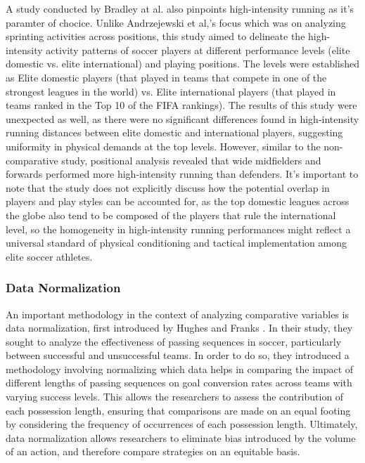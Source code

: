 A study conducted by Bradley at al. \cite{Bradley2010} also pinpoints high-intensity running as it's paramter of chocice. Unlike Andrzejewski et al,'s \cite{Andrzejewski2013} focus which was on analyzing sprinting activities across positions, this study aimed to delineate the high-intensity activity patterns of soccer players at different performance levels (elite domestic vs. elite international) and playing positions. The levels were established as Elite domestic players (that played in teams that compete in one of the strongest leagues in the world) vs. Elite international players (that played in teams ranked in the Top 10 of the FIFA rankings). The results of this study were unexpected as well, as there were no significant differences found in high-intensity running distances between elite domestic and international players, suggesting uniformity in physical demands at the top levels. However, similar to the non-comparative study, positional analysis revealed that wide midfielders and forwards performed more high-intensity running than defenders. It's important to note that the study does not explicitly discuss how the potential overlap in players and play styles can be accounted for, as the top domestic leagues across the globe also tend to be composed of the players that rule the international level, so the homogeneity in high-intensity running performances might reflect a universal standard of physical conditioning and tactical implementation among elite soccer athletes. 


\subsubsection{Data Normalization}
An important methodology in the context of analyzing comparative variables is data normalization, first introduced by Hughes and Franks \cite{Hughes2005}. In their study, they sought to analyze the effectiveness of passing sequences in soccer, particularly between successful and unsuccessful teams. In order to do so, they introduced a methodology involving normalizing which data helps in comparing the impact of different lengths of passing sequences on goal conversion rates across teams with varying success levels. This allows the researchers to assess the contribution of each possession length, ensuring that comparisons are made on an equal footing by considering the frequency of occurrences of each possession length. 
Ultimately, data normalization allows researchers to eliminate bias introduced by the volume of an action, and therefore compare strategies on an equitable basis. 



